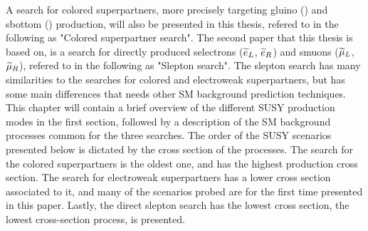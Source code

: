 A search for colored superpartners, more precisely targeting gluino (\gluino) and sbottom (\sbottom) production, will also be presented in this thesis, refered to in the following as "Colored superpartner search".
The second paper that this thesis is based on, is a search for directly produced selectrons ($\widetilde{e}_{L}$, $\widetilde{e}_{R}$) and smuons ($\widetilde{\mu}_{L}$, $\widetilde{\mu}_{R}$), refered to in the following as "Slepton search". 
The slepton search has many similarities to the searches for colored and electroweak superpartners, but has some main differences that needs other SM background prediction techniques. 
This chapter will contain a brief overview of the different SUSY production modes in the first section, followed by a description of the SM background processes common for the three searches. 
The order of the SUSY scenarios presented below is dictated by the cross section of the processes. 
The search for the colored superpartners is the oldest one, and has the highest production cross section. 
The search for electroweak superpartners has a lower cross section associated to it, and many of the scenarios probed are for the first time presented in this paper. 
Lastly, the direct slepton search has the lowest cross section, the lowest cross-section process, is presented. 
